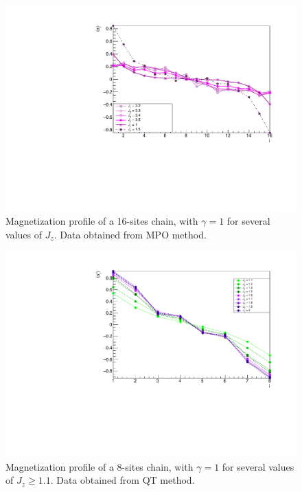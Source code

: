 \begin{figure}[H]
    \centering
    \includegraphics[scale=0.7]{Figures/16sites/16sites_LMvsLOWJz.pdf}
    \caption{Magnetization profile of a 16-sites chain, with $\gamma = 1$ for several values of $J_z$. Data obtained from MPO method.}
    \label{fig:16sites_LMvsLOWJz}
\end{figure}

\begin{figure}[H]
    \centering
    \includegraphics[scale=0.7]{Figures/8sites/8sites_LMvsJz_gtOneQT.pdf}
    \caption{Magnetization profile of a 8-sites chain, with $\gamma = 1$ for several values of $J_z \geq 1.1$. Data obtained from QT method.}
    \label{fig:8sites_LMvsJz_gtOneQT}
\end{figure}


